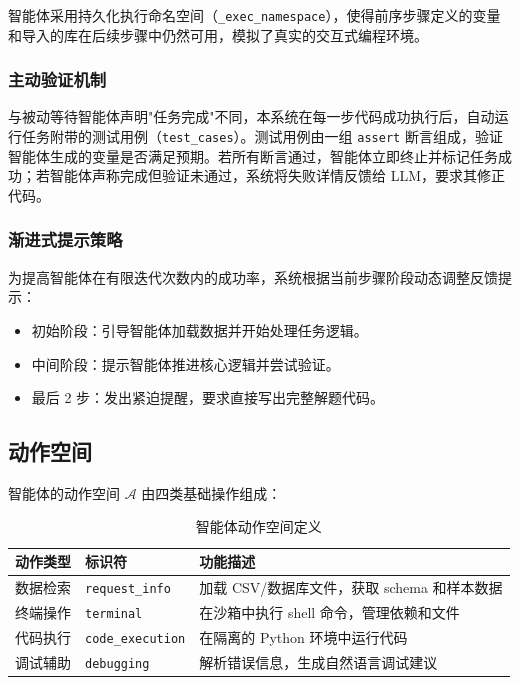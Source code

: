 智能体采用持久化执行命名空间（\texttt{\_exec\_namespace}），使得前序步骤定义的变量和导入的库在后续步骤中仍然可用，模拟了真实的交互式编程环境。

\subsubsection{主动验证机制}

与被动等待智能体声明"任务完成"不同，本系统在每一步代码成功执行后，自动运行任务附带的测试用例（\texttt{test\_cases}）。测试用例由一组 \texttt{assert} 断言组成，验证智能体生成的变量是否满足预期。若所有断言通过，智能体立即终止并标记任务成功；若智能体声称完成但验证未通过，系统将失败详情反馈给 LLM，要求其修正代码。

\subsubsection{渐进式提示策略}

为提高智能体在有限迭代次数内的成功率，系统根据当前步骤阶段动态调整反馈提示：
\begin{itemize}
    \item 初始阶段：引导智能体加载数据并开始处理任务逻辑。
    \item 中间阶段：提示智能体推进核心逻辑并尝试验证。
    \item 最后 2 步：发出紧迫提醒，要求直接写出完整解题代码。
\end{itemize}

\subsection{动作空间}

智能体的动作空间 $\mathcal{A}$ 由四类基础操作组成：

\begin{table}[htbp]
    \centering
    \caption{智能体动作空间定义}
    \label{tab:action-space}
    \begin{tabular}{lll}
        \toprule
        动作类型 & 标识符 & 功能描述 \\
        \midrule
        数据检索 & \texttt{request\_info} & 加载 CSV/数据库文件，获取 schema 和样本数据 \\
        终端操作 & \texttt{terminal} & 在沙箱中执行 shell 命令，管理依赖和文件 \\
        代码执行 & \texttt{code\_execution} & 在隔离的 Python 环境中运行代码 \\
        调试辅助 & \texttt{debugging} & 解析错误信息，生成自然语言调试建议 \\
        \bottomrule
    \end{tabular}
\end{table}

